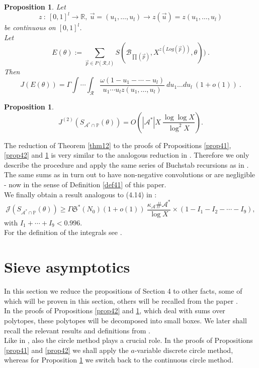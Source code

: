 \documentclass{amsart}
\newtheorem{proposition}[theorem]{Proposition}
\numberwithin{equation}{subsection}
\begin{document}
\begin{proposition}\label{prop43}
Let
$$z\::\: [0,1]^l\rightarrow \mathbb{R},\ \vec{u}=(u_1,\ldots, u_l)\rightarrow z(\vec{u})=z(u_1, \ldots, u_l)$$
be continuous on $[0,1]^l$.\\
Let 
$$E(\theta):=\sum_{\vec{p}\in P(\mathcal{R}, l)} S(\mathcal{B}_{\prod(\vec{p})}, X^{z(Log(\vec{p}))}, \theta))\:.$$
Then 
$$J(E(\theta))=\Gamma\int\cdots\int_\mathcal{R} \frac{\omega(1-u_1-\cdots - u_l)}{u_1\cdots u_l z(u_1, \ldots, u_l)}\: du_1\ldots du_l\: (1+o(1))\:.$$
\end{proposition}

\begin{proposition}\label{prop4646}
$$J^{(2)}(S_{\mathcal{A}^*\cap \mathbb{P}}(\theta))=O\left(|\mathcal{A}^*|X\:\frac{\log\log X}{\log^2 X}\right).$$
\end{proposition}

The reduction of Theorem \ref{thm12} to the proofs of Propositions \ref{prop41}, \ref{prop42} and \ref{prop43} is very similar to the analogous reduction in \cite{maier-rassias-gold}. Therefore we only describe the procedure and apply the same series of Buchstab recursions as in \cite{maier-rassias-gold}. The same sums as in \cite{maier-rassias-gold} turn out to have non-negative convolutions or are negligible - now in the sense of Definition \ref{def41} of this paper.\\
We finally obtain a result analogous to (4.14) in \cite{maier-rassias-gold}:\\
$$\mathcal{J}(S_{\mathcal{A}^*\cap \mathbb{P}}(\theta))\geq \Gamma \mathfrak{S}^*(N_0)(1+o(1))\: \frac{\kappa_{\mathcal{A}}\#\mathcal{A}^*}{\log X} 
\times (1-I_1-I_2-\cdots -I_9),$$
with $I_1+\cdots+I_9<0.996$.\\
For the definition of the integrals see \cite{maier-rassias-gold}.


\section{Sieve asymptotics}

In this section we reduce the propositions of Section 4 to other facts, some of which will be proven in this section, others will be recalled from the paper \cite{maier-rassias-gold}.\\
In the proofs of Propositions \ref{prop42} and \ref{prop43}, which deal with sums over polytopes, these polytopes will be decomposed into small boxes. We later shall recall the relevant results and definitions from \cite{maier-rassias-gold}.\\
Like in \cite{maier-rassias-gold}, also the circle method plays a crucial role. In the proofs of Propositions  \ref{prop41} and \ref{prop42} we shall apply the $a$-variable discrete circle method, whereas for Proposition \ref{prop43} we switch back to the continuous circle method. 
\end{document}
